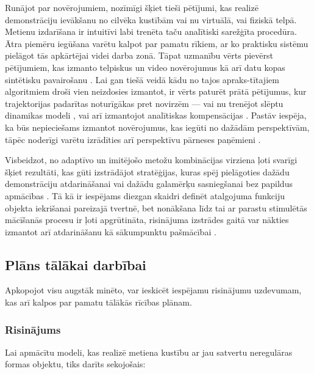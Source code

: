 \documentclass[12pt, a4paper]{article}
\numberwithin{equation}{section} %
\begin{document}
Runājot par novērojumiem, nozīmīgi šķiet tieši pētījumi, kas realizē demonstrāciju ievākšanu no cilvēka kustībām \cite{jha2017imitation,zhang2018deep} vai nu virtuālā, vai fiziskā telpā. Metienu izdarīšana ir intuitīvi labi trenēta taču analītiski sarežģīta procedūra. Ātra piemēru iegūšana varētu kalpot par pamatu rīkiem, ar ko praktisku sistēmu pielāgot tās apkārtējai videi darba zonā. Tāpat uzmanību vērts pievērst pētījumiem, kas izmanto telpiskus un video novērojumus kā arī datu kopas sintētisku pavairošanu \cite{dyrstad2018teaching}. Lai gan tiešā veidā kādu no tajos apraks-tītajiem algoritmiem droši vien neizdosies izmantot, ir vērts paturēt prātā pētījumus, kur trajektorijas padarītas noturīgākas pret novirzēm --- vai nu trenējot slēptu dinamikas modeli \cite{torabi2018behavioral}, vai arī izmantojot analītiskas kompensācijas \cite{pastor2011online}. Pastāv iespēja, ka būs nepieciešams izmantot novērojumus, kas iegūti no dažādām perspektīvām, tāpēc noderīgi varētu izrādīties arī perspektīvu pārneses paņēmieni \cite{liu2018imitation}.

Visbeidzot, no adaptīvo un imitējošo metožu kombinācijas virziena ļoti svarīgi šķiet rezultāti, kas gūti izstrādājot stratēģijas, kuras spēj pielāgoties dažādu demonstrāciju atdarināšanai \cite{duan2017one} vai dažādu galamērķu sasniegšanai bez papildus apmācības \cite{lynch2020learning,lynch2021language,gupta2019relay}. Tā kā ir iespējams diezgan skaidri definēt atalgojuma funkciju objekta iekrišanai pareizajā tvertnē, bet nonākšana līdz tai ar parastu stimulētās mācīšanās procesu ir ļoti apgrūtināta, risinājuma izstrādes gaitā var nākties izmantot arī atdarināšanu kā sākumpunktu pašmācībai \cite{hester2018deep}. 



\subsection{Plāns tālākai darbībai}

Apkopojot visu augstāk minēto, var ieskicēt iespējamu risinājumu uzdevumam, kas arī kalpos par pamatu tālākās rīcības plānam. 

\subsubsection{Risinājums}

Lai apmācītu modeli, kas realizē metiena kustību ar jau satvertu neregulāras formas objektu, tiks darīts sekojošais:
\end{document}
